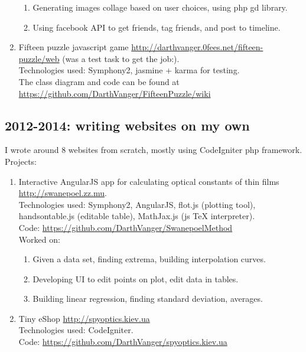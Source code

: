 \documentclass[a4paper, 14pt]{article}
\begin{document}
\begin{enumerate}
\begin{enumerate}
                \item Generating images collage based on user choices, using php gd library.
                \item Using facebook API to get friends, tag friends, and post to timeline.
            \end{enumerate}
        \item Fifteen puzzle javascript game \url{http://darthvanger.0fees.net/fifteen-puzzle/web} (was a test task to get the job:). \\
            Technologies used: Symphony2, jasmine + karma for testing. \\
            The class diagram and code can be found at \\
            \url{https://github.com/DarthVanger/FifteenPuzzle/wiki}
    \end{enumerate}

	\subsection{2012-2014: writing websites on my own}
	I wrote around 8 websites from scratch, mostly using CodeIgniter php framework. \\
    Projects:
        \begin{enumerate}
            \item Interactive AngularJS app for calculating optical constants of thin films \\
            \url{http://swanepoel.zz.mu}. \\
            Technologies used: Symphony2, AngularJS, flot.js (plotting tool), handsontable.js (editable table), MathJax.js (js TeX interpreter). \\
            Code: \url{https://github.com/DarthVanger/SwanepoelMethod} \\
            Worked on:
            \begin{enumerate}
                \item Given a data set, finding extrema, building interpolation curves.
                \item Developing UI to edit points on plot, edit data in tables.
                \item Building linear regression, finding standard deviation, averages.
            \end{enumerate}

            \item Tiny eShop \url{http://spyoptics.kiev.ua} \\
            Technologies used: CodeIgniter. \\
            Code: \url{https://github.com/DarthVanger/spyoptics.kiev.ua}
        \end{enumerate}

      
\end{document}
